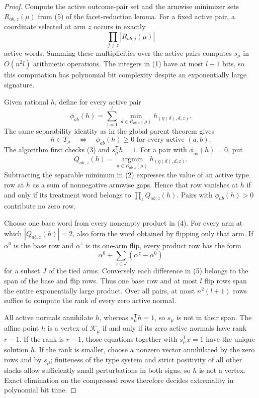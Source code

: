 \documentclass{article}
\begin{document}
\begin{proof}
Compute the active outcome-pair set and the armwise minimizer sets \(R_{ab,z}(\mu)\) from (5) of the facet-reduction lemma. For a fixed active pair, a coordinate selected at arm \(z\) occurs in exactly
\[\prod_{j\ne z}|R_{ab,j}(\mu)|\tag{1}\]
active words. Summing these multiplicities over the active pairs computes \(s_\mu\) in \(O(n^2l)\) arithmetic operations. The integers in (1) have at most \(l+1\) bits, so this computation has polynomial bit complexity despite an exponentially large signature.

Given rational \(h\), define for every active pair
\[\phi_{ab}(h)=\sum_{z=1}^l\min_{d\in R_{ab,z}(\mu)}h_{(\eta(d),d,z)}.\tag{2}\]
The same separability identity as in the global-parent theorem gives
\[h\in T_\mu\quad\Longleftrightarrow\quad \phi_{ab}(h)\ge0\text{ for every active }(a,b).\tag{3}\]
The algorithm first checks (3) and \(s_\mu^{\mathsf T}h=1\). For a pair with \(\phi_{ab}(h)=0\), put
\[Q_{ab,z}(h)=\operatorname*{argmin}_{d\in R_{ab,z}(\mu)}h_{(\eta(d),d,z)}.\tag{4}\]
Subtracting the separable minimum in (2) expresses the value of an active type row at \(h\) as a sum of nonnegative armwise gaps. Hence that row vanishes at \(h\) if and only if its treatment word belongs to \(\prod_zQ_{ab,z}(h)\). Pairs with \(\phi_{ab}(h)>0\) contribute no zero row.

Choose one base word from every nonempty product in (4). For every arm at which \(|Q_{ab,z}(h)|=2\), also form the word obtained by flipping only that arm. If \(\alpha^0\) is the base row and \(\alpha^z\) is its one-arm flip, every product row has the form
\[\alpha^0+\sum_{z\in J}(\alpha^z-\alpha^0)\tag{5}\]
for a subset \(J\) of the tied arms. Conversely each difference in (5) belongs to the span of the base and flip rows. Thus one base row and at most \(l\) flip rows span the entire exponentially large product. Over all pairs, at most \(n^2(l+1)\) rows suffice to compute the rank of every zero active normal.

All active normals annihilate \(h\), whereas \(s_\mu^{\mathsf T}h=1\), so \(s_\mu\) is not in their span. The affine point \(h\) is a vertex of \(\mathcal K_\mu\) if and only if its zero active normals have rank \(r-1\). If the rank is \(r-1\), those equations together with \(s_\mu^{\mathsf T}x=1\) have the unique solution \(h\). If the rank is smaller, choose a nonzero vector annihilated by the zero rows and by \(s_\mu\); finiteness of the type system and strict positivity of all other slacks allow sufficiently small perturbations in both signs, so \(h\) is not a vertex. Exact elimination on the compressed rows therefore decides extremality in polynomial bit time.


\end{proof}
\end{document}
